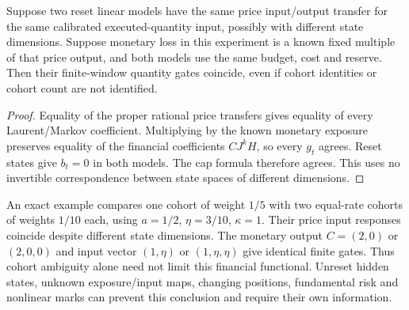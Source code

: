 \begin{proposition}
Suppose two reset linear models have the same price input/output transfer for the same calibrated executed-quantity input, possibly with different state dimensions. Suppose monetary loss in this experiment is a known fixed multiple of that price output, and both models use the same budget, cost and reserve. Then their finite-window quantity gates coincide, even if cohort identities or cohort count are not identified.
\end{proposition}
\begin{proof}
Equality of the proper rational price transfers gives equality of every Laurent/Markov coefficient. Multiplying by the known monetary exposure preserves equality of the financial coefficients $CJ^kH$, so every $g_t$ agrees. Reset states give $b_t=0$ in both models. The cap formula therefore agrees. This uses no invertible correspondence between state spaces of different dimensions.
\end{proof}

An exact example compares one cohort of weight $1/5$ with two equal-rate cohorts of weights $1/10$ each, using $a=1/2$, $\eta=3/10$, $\kappa=1$. Their price input responses coincide despite different state dimensions. The monetary output $C=(2,0)$ or $(2,0,0)$ and input vector $(1,\eta)$ or $(1,\eta,\eta)$ give identical finite gates. Thus cohort ambiguity alone need not limit this financial functional. Unreset hidden states, unknown exposure/input maps, changing positions, fundamental risk and nonlinear marks can prevent this conclusion and require their own information.


